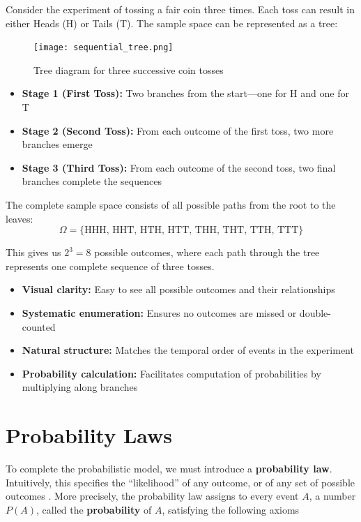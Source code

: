 \begin{itemize}
Consider the experiment of tossing a fair coin three times. Each toss can result in either Heads (H) or Tails (T). The sample space can be represented as a tree:

\begin{figure}[h]
    \centering
    \texttt{[image: sequential\_tree.png]}
    \caption{Tree diagram for three successive coin tosses}
    \label{fig:sequential_tree}
\end{figure}

\begin{itemize}
    \item \textbf{Stage 1 (First Toss):} Two branches from the start—one for H and one for T
    \item \textbf{Stage 2 (Second Toss):} From each outcome of the first toss, two more branches emerge
    \item \textbf{Stage 3 (Third Toss):} From each outcome of the second toss, two final branches complete the sequences
\end{itemize}

The complete sample space consists of all possible paths from the root to the leaves:
\[ \Omega = \{\text{HHH, HHT, HTH, HTT, THH, THT, TTH, TTT}\} \]

This gives us $2^3 = 8$ possible outcomes, where each path through the tree represents one complete sequence of three tosses.

\begin{itemize}
    \item \textbf{Visual clarity:} Easy to see all possible outcomes and their relationships
    \item \textbf{Systematic enumeration:} Ensures no outcomes are missed or double-counted
    \item \textbf{Natural structure:} Matches the temporal order of events in the experiment
    \item \textbf{Probability calculation:} Facilitates computation of probabilities by multiplying along branches
\end{itemize}

\section{Probability Laws}
To complete the probabilistic model, we must introduce a \textbf{probability law}. Intuitively, this specifies the “likelihood” of any outcome, or of any set of possible outcomes . More precisely, the probability law assigns to every event \(A\), a number \(P(A)\), called the \textbf{probability} of \(A\), satisfying the following axioms 


\end{itemize}
